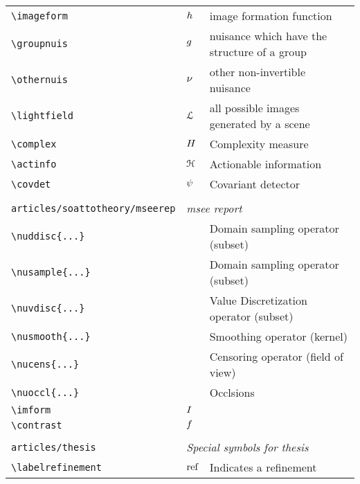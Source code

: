 \begin{longtable}{lll}
 {\color[rgb]{0.5,0.5,0.5}\texttt{\textbackslash imageform}} & $h$ &  image formation function\\ 
 {\color[rgb]{0.5,0.5,0.5}\texttt{\textbackslash groupnuis}} & $g$ &  nuisance which have the structure of a group\\ 
 {\color[rgb]{0.5,0.5,0.5}\texttt{\textbackslash othernuis}} & $\nu$ &  other non-invertible nuisance\\ 
 {\color[rgb]{0.5,0.5,0.5}\texttt{\textbackslash lightfield}} & $\mathcal{L}$ &  all possible images generated by a scene\\ 
 {\color[rgb]{0.5,0.5,0.5}\texttt{\textbackslash complex}} & $H$ &  Complexity measure\\ 
 {\color[rgb]{0.5,0.5,0.5}\texttt{\textbackslash actinfo}} & $\mathcal{H}$ &  Actionable information\\ 
 {\color[rgb]{0.5,0.5,0.5}\texttt{\textbackslash covdet}} & $\psi$ &  Covariant detector\\ 
  &  & \\ 
 {\color[rgb]{0.5,0.5,0.5}\texttt{articles/soattotheory/mseerep}} & \multicolumn{2}{l}{\emph{msee report}}\\ 
 \hline
{\color[rgb]{0.5,0.5,0.5}\texttt{\textbackslash nuddisc\{...\}}} &  &  Domain sampling operator (subset)\\ 
 {\color[rgb]{0.5,0.5,0.5}\texttt{\textbackslash nusample\{...\}}} &  &  Domain sampling operator (subset)\\ 
 {\color[rgb]{0.5,0.5,0.5}\texttt{\textbackslash nuvdisc\{...\}}} &  &  Value Discretization operator (subset)\\ 
 {\color[rgb]{0.5,0.5,0.5}\texttt{\textbackslash nusmooth\{...\}}} &  &  Smoothing operator (kernel)\\ 
 {\color[rgb]{0.5,0.5,0.5}\texttt{\textbackslash nucens\{...\}}} &  &  Censoring operator (field of view)\\ 
 {\color[rgb]{0.5,0.5,0.5}\texttt{\textbackslash nuoccl\{...\}}} &  &  Occlsions\\ 
 {\color[rgb]{0.5,0.5,0.5}\texttt{\textbackslash imform}} & $I$ & \\ 
 {\color[rgb]{0.5,0.5,0.5}\texttt{\textbackslash contrast}} & $f$ & \\ 
  &  & \\ 
 {\color[rgb]{0.5,0.5,0.5}\texttt{articles/thesis}} & \multicolumn{2}{l}{\emph{Special symbols for thesis}}\\ 
 \hline
{\color[rgb]{0.5,0.5,0.5}\texttt{\textbackslash labelrefinement}} & $\text{ref}$ &  Indicates a refinement\\ 

\end{longtable}
